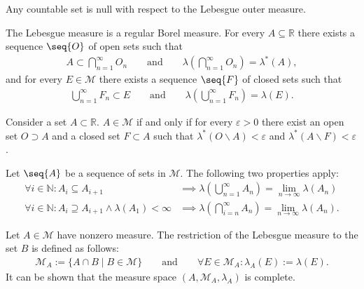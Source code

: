     \begin{property}\label{lebesgue:countable_set_is_null}
        Any countable set is null with respect to the Lebesgue outer measure.
    \end{property}

    \begin{property}[Regularity]
        The Lebesgue measure is a regular Borel measure. For every $A\subseteq\mathbb{R}$ there exists a sequence $\seq{O}$ of open sets such that
        \begin{gather}
            \label{lebesgue:open_cover_existence}
            A\subset\bigcap_{n=1}^\infty O_n\qquad\text{and}\qquad\lambda\left(\bigcap_{n=1}^\infty O_n\right) = \lambda^*(A),
        \end{gather}
        and for every $E\in\mathcal{M}$ there exists a sequence $\seq{F}$ of closed sets such that
        \begin{gather}
            \label{lebesgue:closed_cover_existence}
            \bigcup_{n=1}^\infty F_n\subset E\qquad\text{and}\qquad\lambda\left(\bigcup_{n=1}^\infty F_n\right) = \lambda(E).
        \end{gather}
    \end{property}

    \begin{property}
        Consider a set $A\subset\mathbb{R}$. $A\in\mathcal{M}$ if and only if for every $\varepsilon>0$ there exist an open set $O\supset A$ and a closed set $F\subset A$ such that $\lambda^*(O\backslash A) < \varepsilon$ and $\lambda^*(A\backslash F)<\varepsilon$.
    \end{property}

    \begin{property}
        Let $\seq{A}$ be a sequence of sets in $\mathcal{M}$. The following two properties apply:
        \begin{align}
            \forall i\in\mathbb{N}:A_i\subseteq A_{i+1} &\implies \lambda\left(\bigcup_{n=1}^\infty A_n\right) = \lim_{n\rightarrow\infty}\lambda(A_n)\\
            \forall i\in\mathbb{N}:A_i\supseteq A_{i+1}\land\lambda(A_1)<\infty &\implies\lambda\left(\bigcap_{i=n}^\infty A_n\right) = \lim_{n\rightarrow\infty}\lambda(A_n).
        \end{align}
    \end{property}

    \begin{construct}[Restriction]\label{lebesgue:restricted_lebesgue_measure}
        Let $A\in\mathcal{M}$ have nonzero measure. The restriction of the Lebesgue measure to the set $B$ is defined as follows:
        \begin{gather}
            \mathcal{M}_A := \{A\cap B\mid B\in\mathcal{M}\} \qquad\text{and}\qquad \forall E\in\mathcal{M}_A:\lambda_A(E) := \lambda(E).
        \end{gather}
        It can be shown that the measure space $(A,\mathcal{M}_A,\lambda_A)$ is complete.
    \end{construct}

